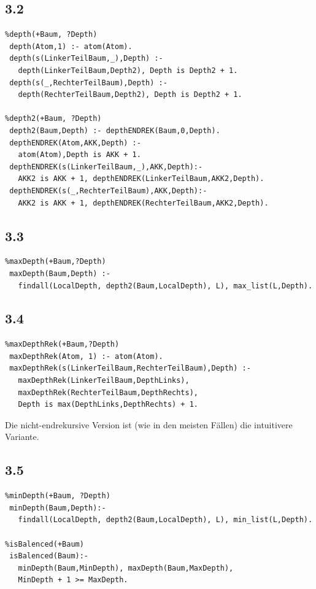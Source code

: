 \documentclass[a4paper, 11pt]{article}
\begin{document}
\subsection*{3.2}

\begin{verbatim}
%depth(+Baum, ?Depth)
 depth(Atom,1) :- atom(Atom).
 depth(s(LinkerTeilBaum,_),Depth) :-
   depth(LinkerTeilBaum,Depth2), Depth is Depth2 + 1.
 depth(s(_,RechterTeilBaum),Depth) :-
   depth(RechterTeilBaum,Depth2), Depth is Depth2 + 1.

%depth2(+Baum, ?Depth)
 depth2(Baum,Depth) :- depthENDREK(Baum,0,Depth).
 depthENDREK(Atom,AKK,Depth) :-
   atom(Atom),Depth is AKK + 1.
 depthENDREK(s(LinkerTeilBaum,_),AKK,Depth):-
   AKK2 is AKK + 1, depthENDREK(LinkerTeilBaum,AKK2,Depth).
 depthENDREK(s(_,RechterTeilBaum),AKK,Depth):-
   AKK2 is AKK + 1, depthENDREK(RechterTeilBaum,AKK2,Depth).
\end{verbatim}

\subsection*{3.3}

\begin{verbatim}
%maxDepth(+Baum,?Depth)
 maxDepth(Baum,Depth) :- 
   findall(LocalDepth, depth2(Baum,LocalDepth), L), max_list(L,Depth).
\end{verbatim}

\subsection*{3.4}

\begin{verbatim}
%maxDepthRek(+Baum,?Depth)
 maxDepthRek(Atom, 1) :- atom(Atom).
 maxDepthRek(s(LinkerTeilBaum,RechterTeilBaum),Depth) :-
   maxDepthRek(LinkerTeilBaum,DepthLinks),
   maxDepthRek(RechterTeilBaum,DepthRechts),
   Depth is max(DepthLinks,DepthRechts) + 1.
\end{verbatim}

Die nicht-endrekursive Version ist (wie in den meisten F\"allen) die intuitivere Variante.

\subsection*{3.5}

\begin{verbatim}
%minDepth(+Baum, ?Depth)
 minDepth(Baum,Depth):-
   findall(LocalDepth, depth2(Baum,LocalDepth), L), min_list(L,Depth).
   
%isBalenced(+Baum)
 isBalenced(Baum):-
   minDepth(Baum,MinDepth), maxDepth(Baum,MaxDepth),
   MinDepth + 1 >= MaxDepth.
\end{verbatim}
\end{document}
